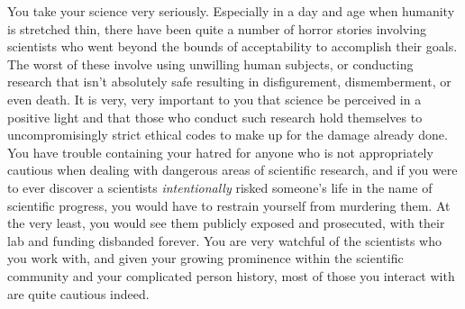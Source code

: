\documentclass[char]{guildcamp1}
\begin{document}
You take your science very seriously. Especially in a day and age when humanity is stretched thin, there have been quite a number of horror stories involving scientists who went beyond the bounds of acceptability to accomplish their goals. The worst of these involve using unwilling human subjects, or conducting research that isn't absolutely safe resulting in disfigurement, dismemberment, or even death. It is very, very important to you that science be perceived in a positive light and that those who conduct such research hold themselves to uncompromisingly strict ethical codes to make up for the damage already done. You have trouble containing your hatred for anyone who is not appropriately cautious when dealing with dangerous areas of scientific research, and if you were to ever discover a scientists \emph{intentionally} risked someone's life in the name of scientific progress, you would have to restrain yourself from murdering them. At the very least, you would see them publicly exposed and prosecuted, with their lab and funding disbanded forever. You are very watchful of the scientists who you work with, and given your growing prominence within the scientific community and your complicated person history, most of those you interact with are quite cautious indeed.
\end{document}
